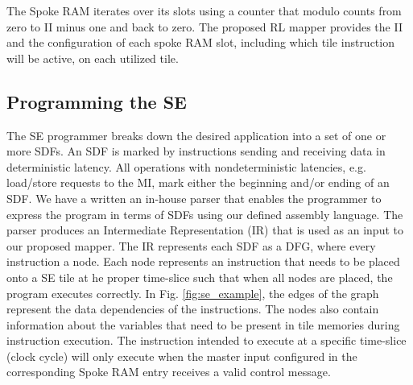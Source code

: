 The Spoke RAM iterates over its slots using a counter that modulo counts from zero to II minus one and back to zero.
The proposed RL mapper provides the II and the configuration of each spoke RAM slot, including which tile instruction will be active, on each utilized tile.

\subsection{Programming the SE}
The SE programmer breaks down the desired application into a set of one or more SDFs.
An SDF is marked by instructions sending and receiving data in deterministic latency.
All operations with nondeterministic latencies, e.g. load/store requests to the MI, mark either the beginning and/or ending of an SDF.
We have a written an in-house parser that enables the programmer to express the program in terms of SDFs using our defined assembly language.
The parser produces an Intermediate Representation (IR) that is used as an input to our proposed mapper.
The IR represents each SDF as a DFG, where every instruction a node.
Each node represents an instruction that needs to be placed onto a SE tile at he proper time-slice such that when all nodes are placed, the program executes correctly. 
In Fig. \ref{fig:se_example}, the edges of the graph represent the data dependencies of the instructions. 
The nodes also contain information about the variables that need to be present in tile memories during instruction execution. 
The instruction intended to execute at a specific time-slice (clock cycle) will only execute when the master input configured in the corresponding Spoke RAM entry receives a valid control message.

